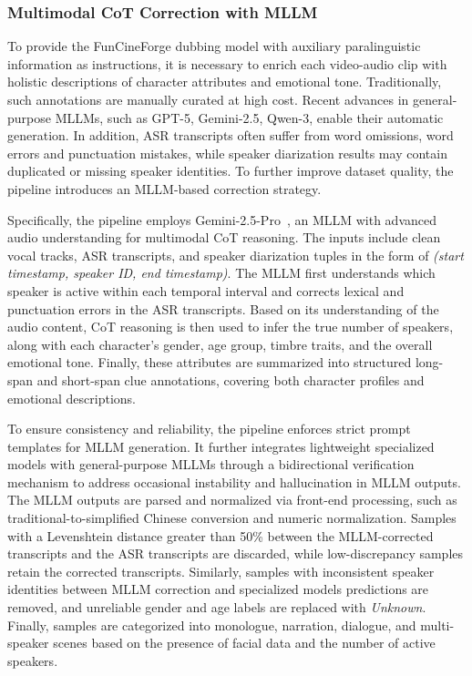 \documentclass{article}
\begin{document}
\subsubsection{Multimodal CoT Correction with MLLM}
To provide the FunCineForge dubbing model with auxiliary paralinguistic information as instructions,
it is necessary to enrich each video-audio clip with holistic descriptions of character attributes and emotional tone.
Traditionally, such annotations are manually curated at high cost.
Recent advances in general-purpose MLLMs, such as GPT-5, Gemini-2.5, Qwen-3, 
enable their automatic generation.
In addition, ASR transcripts often suffer from word omissions, word errors and punctuation mistakes,
while speaker diarization results may contain duplicated or missing speaker identities.
To further improve dataset quality, the pipeline introduces an MLLM-based correction strategy.

Specifically, the pipeline employs Gemini-2.5-Pro~\cite{Gemini2.5}, 
an MLLM with advanced audio understanding for multimodal CoT reasoning.
The inputs include clean vocal tracks, ASR transcripts, and speaker diarization tuples
in the form of \textit{(start timestamp, speaker ID, end timestamp)}.
The MLLM first understands which speaker is active within each temporal interval and 
corrects lexical and punctuation errors in the ASR transcripts.
Based on its understanding of the audio content, CoT reasoning is then used to infer
the true number of speakers, along with each character's gender, age group, timbre traits, and the overall emotional tone.
Finally, these attributes are summarized into structured long-span and short-span clue annotations,
covering both character profiles and emotional descriptions.

To ensure consistency and reliability, the pipeline enforces strict prompt templates for MLLM generation.
It further integrates lightweight specialized models with general-purpose MLLMs through a bidirectional verification mechanism
to address occasional instability and hallucination in MLLM outputs.
The MLLM outputs are parsed and normalized via front-end processing, such as traditional-to-simplified Chinese conversion and numeric normalization.
Samples with a Levenshtein distance greater than 50\% between the MLLM-corrected transcripts and the ASR transcripts are discarded,
while low-discrepancy samples retain the corrected transcripts.
Similarly, samples with inconsistent speaker identities between MLLM correction and specialized models predictions are removed,
and unreliable gender and age labels are replaced with \textit{Unknown}.
Finally, samples are categorized into monologue, narration, dialogue, and multi-speaker scenes
based on the presence of facial data and the number of active speakers.
\end{document}
